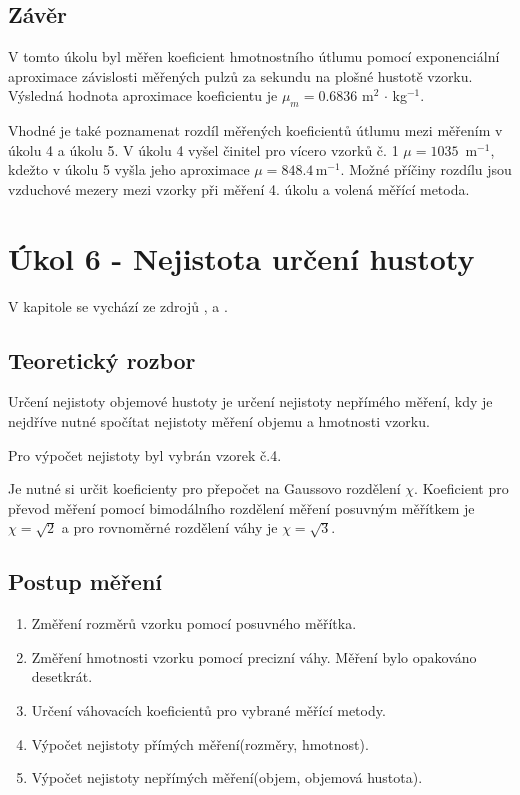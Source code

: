 \documentclass[fleqn]{protokol}
\begin{document}
        
    \pagebreak 
    \subsection{Závěr}
    V tomto úkolu byl měřen koeficient hmotnostního útlumu pomocí exponenciální aproximace závislosti měřených pulzů za sekundu na plošné hustotě vzorku. Výsledná hodnota aproximace koeficientu je $\mu_m = 0.6836 $ m$^{2}$ $\cdot$ kg$^{-1}$.

    Vhodné je také poznamenat rozdíl měřených koeficientů útlumu mezi měřením v úkolu 4 a úkolu 5. V úkolu 4 vyšel činitel pro vícero vzorků č. 1 $\mu = 1035 \, \text{ m}^{-1}$, kdežto v úkolu 5 vyšla jeho aproximace $\mu = 848.4 \, \text{m}^{-1}$. Možné příčiny rozdílu jsou vzduchové mezery mezi vzorky při měření 4. úkolu a volená měřící metoda.

\pagebreak

\section{Úkol 6 - Nejistota určení hustoty}
    V kapitole se vychází ze zdrojů \cite{nejistoty_prezentace}, \cite{zaokrouhlovani} a \cite{nejistoty}.
    \subsection{Teoretický rozbor}
    Určení nejistoty objemové hustoty je určení nejistoty nepřímého měření, \linebreak kdy je nejdříve nutné spočítat nejistoty měření objemu a hmotnosti vzorku.

    Pro výpočet nejistoty byl vybrán vzorek č.4.

    Je nutné si určit koeficienty pro přepočet na Gaussovo rozdělení $\chi$. Koeficient pro převod měření pomocí bimodálního rozdělení měření posuvným měřítkem je $\chi = \sqrt{2}$ a pro rovnoměrné rozdělení váhy je $\chi = \sqrt{3}$\cite{nejistoty_prezentace}.
    \subsection{Postup měření}
        \begin{enumerate}
            \item Změření rozměrů vzorku pomocí posuvného měřítka.
            \item Změření hmotnosti vzorku pomocí precizní váhy. Měření bylo opakováno desetkrát.
            \item Určení váhovacích koeficientů pro vybrané měřící metody.
            \item Výpočet nejistoty přímých měření(rozměry, hmotnost).
            \item Výpočet nejistoty nepřímých měření(objem, objemová hustota). 
        \end{enumerate}
\end{document}
